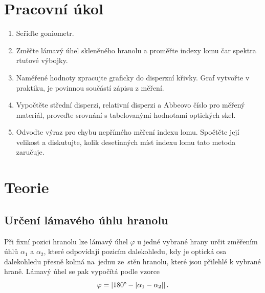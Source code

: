 \documentclass{../concepts/titul_protokol_p/prepareprotokol} %
\begin{document}
\renewcommand{\figurename}{Graf}
\renewcommand{\refname}{Literatura}

\graphicspath{{../concepts/titul_protokol_p/}}
\maketitle

\section{Pracovní úkol}
\begin{enumerate}
    \item Seřiďte goniometr.
    \item Změřte lámavý úhel skleněného hranolu a proměřte indexy lomu čar spektra rtuťové výbojky.
    \item Naměřené hodnoty zpracujte graficky do disperzní křivky. Graf vytvořte v praktiku, je povinnou součástí zápisu z měření.
    \item Vypočtěte střední disperzi, relativní disperzi a Abbeovo číslo pro měřený materiál, proveďte srovnání s tabelovanými hodnotami optických skel.
    \item Odvoďte výraz pro chybu nepřímého měření indexu lomu. Spočtěte její velikost a diskutujte, kolik desetinných míst indexu lomu tato metoda zaručuje.
\end{enumerate}

\section{Teorie}
\subsection{Určení lámavého úhlu hranolu}

Při fixní pozici hranolu lze lámavý úhel $\varphi$ u jedné vybrané hrany určit změřením 
úhlů $\alpha_1$ a $\alpha_2$, které odpovídají pozicím dalekohledu, kdy je optická osa 
dalekohledu přesně kolmá na~jednu ze~stěn hranolu, které jsou přilehlé k vybrané hraně.
Lámavý úhel se pak vypočítá podle vzorce \cite{pokyny}
\begin{equation}\label{eq:lamavyuhel}
    \varphi = |180\degree - |\alpha_1 - \alpha_2||\,.
\end{equation}
\end{document}
